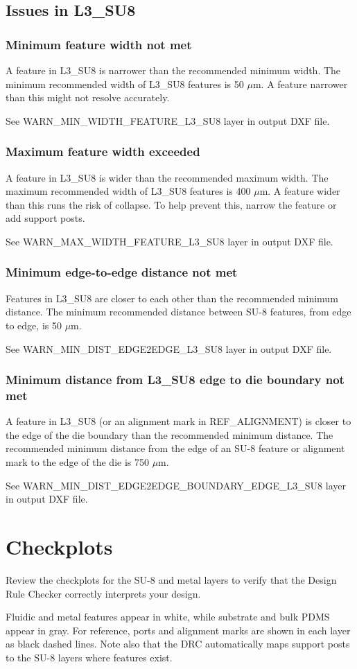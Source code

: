 \documentclass[twoside]{article}
\begin{document}
\subsection{Issues in L3\_SU8}
\subsubsection{Minimum feature width not met}
\par A feature in L3\_SU8 is narrower than the recommended minimum width. The
minimum recommended width of L3\_SU8 features is 50 $\mu$m. A feature narrower
than this might not resolve accurately.  \par See
WARN\_MIN\_WIDTH\_FEATURE\_L3\_SU8 layer in output DXF file.

\subsubsection{Maximum feature width exceeded}
\par A feature in L3\_SU8 is wider than the recommended maximum width. The
maximum recommended width of L3\_SU8 features is 400 $\mu$m. A feature wider
than this runs the risk of collapse. To help prevent this, narrow the feature or
add support posts.  \par See WARN\_MAX\_WIDTH\_FEATURE\_L3\_SU8 layer in output
DXF file.

\subsubsection{Minimum edge-to-edge distance not met}
\par Features in L3\_SU8 are closer to each other than the recommended minimum
distance. The minimum recommended distance between SU-8 features, from edge to
edge, is 50 $\mu$m.  \par See WARN\_MIN\_DIST\_EDGE2EDGE\_L3\_SU8 layer in
output DXF file.

\subsubsection{Minimum distance from L3\_SU8 edge to die boundary not met}
\par A feature in L3\_SU8 (or an alignment mark in REF\_ALIGNMENT) is closer to
the edge of the die boundary than the recommended minimum distance. The
recommended minimum distance from the edge of an SU-8 feature or alignment mark
to the edge of the die is 750 $\mu$m.  \par See
WARN\_MIN\_DIST\_EDGE2EDGE\_BOUNDARY\_EDGE\_L3\_SU8 layer in output DXF file.

\section{Checkplots}
Review the checkplots for the SU-8 and metal layers to verify that the Design
Rule Checker correctly interprets your design.  \par Fluidic and metal features
appear in white, while substrate and bulk PDMS appear in gray. For reference,
ports and alignment marks are shown in each layer as black dashed lines. Note
also that the DRC automatically maps support posts to the SU-8 layers where
features exist.
\end{document}
